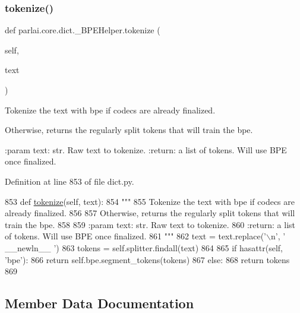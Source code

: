 \subsubsection{\texorpdfstring{tokenize()}{tokenize()}}
{\footnotesize\ttfamily def parlai.\+core.\+dict.\+\_\+\+B\+P\+E\+Helper.\+tokenize (\begin{DoxyParamCaption}\item[{}]{self,  }\item[{}]{text }\end{DoxyParamCaption})}

\begin{DoxyVerb}Tokenize the text with bpe if codecs are already finalized.

Otherwise, returns the regularly split tokens that will train the bpe.

:param text: str. Raw text to tokenize.
:return: a list of tokens. Will use BPE once finalized.
\end{DoxyVerb}
 

Definition at line 853 of file dict.\+py.


\begin{DoxyCode}
853     \textcolor{keyword}{def }\hyperlink{namespaceparlai_1_1agents_1_1tfidf__retriever_1_1build__tfidf_a1fdb457e98eb4e4c26047e229686a616}{tokenize}(self, text):
854         \textcolor{stringliteral}{"""}
855 \textcolor{stringliteral}{        Tokenize the text with bpe if codecs are already finalized.}
856 \textcolor{stringliteral}{}
857 \textcolor{stringliteral}{        Otherwise, returns the regularly split tokens that will train the bpe.}
858 \textcolor{stringliteral}{}
859 \textcolor{stringliteral}{        :param text: str. Raw text to tokenize.}
860 \textcolor{stringliteral}{        :return: a list of tokens. Will use BPE once finalized.}
861 \textcolor{stringliteral}{        """}
862         text = text.replace(\textcolor{stringliteral}{'\(\backslash\)n'}, \textcolor{stringliteral}{' \_\_newln\_\_ '})
863         tokens = self.splitter.findall(text)
864 
865         \textcolor{keywordflow}{if} hasattr(self, \textcolor{stringliteral}{'bpe'}):
866             \textcolor{keywordflow}{return} self.bpe.segment\_tokens(tokens)
867         \textcolor{keywordflow}{else}:
868             \textcolor{keywordflow}{return} tokens
869 
\end{DoxyCode}


\subsection{Member Data Documentation}
\mbox{\label{classparlai_1_1core_1_1dict_1_1__BPEHelper_af99fd825694f985095fd9ac55fcd2ba3}} 
